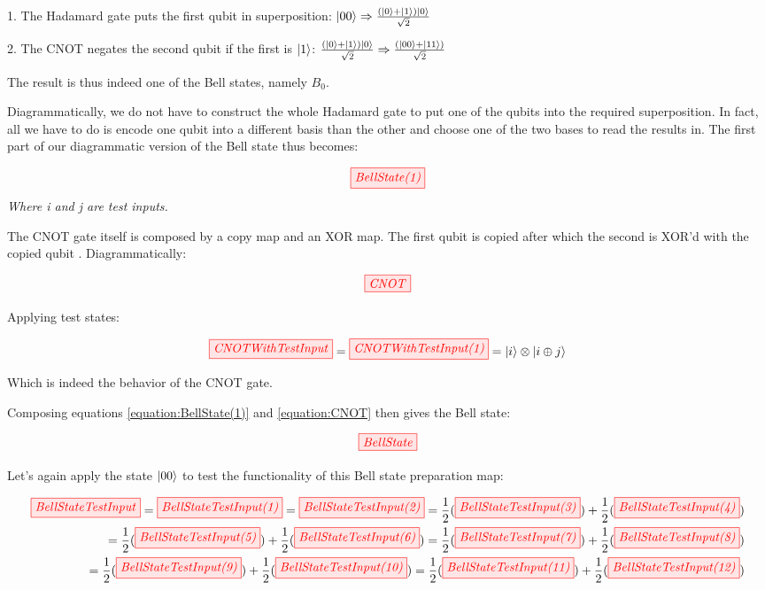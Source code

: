 \documentclass[]{article}
\begin{document}
1. The Hadamard gate puts the first qubit in superposition: $\ket{00} \Rightarrow \frac{(\ket{0} + \ket{1})\ket{0}}{\sqrt{2}}$

2. The CNOT negates the second qubit if the first is $\ket{1}$: $\frac{(\ket{0} + \ket{1})\ket{0}}{\sqrt{2}} \Rightarrow \frac{(\ket{00} + \ket{11})}{\sqrt{2}}$

The result is thus indeed one of the Bell states, namely $B_0$.

Diagrammatically, we do not have to construct the whole Hadamard gate to put one of the qubits into the required superposition. In fact, all we have to do is encode one qubit into a different basis than the other and choose one of the two bases to read the results in. The first part of our diagrammatic version of the Bell state thus becomes:

\begin{equation}
	\label{equation:BellState(1)}
	\tikzfig{BellState(1)}
\end{equation}
\textit{Where i and j are test inputs.}

The CNOT gate itself is composed by a copy map and an XOR map. The first qubit is copied after which the second is XOR'd with the copied qubit \cite{articleCNOT}. Diagrammatically:

\begin{equation}
	\label{equation:CNOT}
	\tikzfig{CNOT}
\end{equation}

Applying test states:

\begin{equation}
	\tikzfig{CNOTWithTestInput} = \tikzfig{CNOTWithTestInput(1)} = \ket{i} \otimes \ket{i \oplus j}
\end{equation}

Which is indeed the behavior of the CNOT gate.

Composing equations \ref{equation:BellState(1)} and \ref{equation:CNOT} then gives the Bell state:

\begin{equation}
	\tikzfig{BellState}
\end{equation}

Let's again apply the state $\ket{00}$ to test the functionality of this Bell state preparation map:

\begin{equation}
\label{BellStateTestInput}
	\begin{split}
	\tikzfig{BellStateTestInput} = \tikzfig{BellStateTestInput(1)} = \tikzfig{BellStateTestInput(2)} = \frac{1}{2}(\tikzfig{BellStateTestInput(3)}) + \frac{1}{2}(\tikzfig{BellStateTestInput(4)}) \\ = \frac{1}{2}(\tikzfig{BellStateTestInput(5)}) +
	\frac{1}{2}(\tikzfig{BellStateTestInput(6)}) 
	= \frac{1}{2}(\tikzfig{BellStateTestInput(7)}) + \frac{1}{2}(\tikzfig{BellStateTestInput(8)}) \\ = \frac{1}{2}(\tikzfig{BellStateTestInput(9)}) +
	 \frac{1}{2}(\tikzfig{BellStateTestInput(10)}) = \frac{1}{2}(\tikzfig{BellStateTestInput(11)}) +
	\frac{1}{2}(\tikzfig{BellStateTestInput(12)})
	\end{split}
\end{equation}
\end{document}
